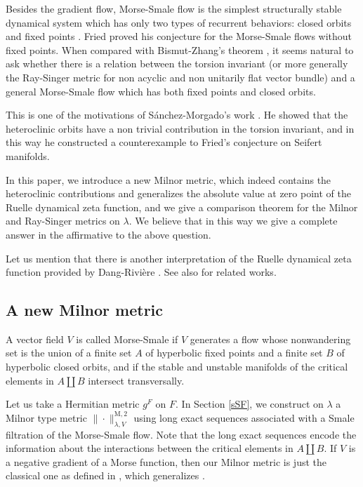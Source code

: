 \documentclass[JEP,XML,SOM,Unicode]{cedram}
\newcommand{\rM}{\mathrm{M}}
\theoremstyle{plain}
\theoremstyle{definition}
\theoremstyle{remark}
\begin{document}
Besides the gradient flow, Morse-Smale flow is the simplest structurally stable dynamical system
which has only two types of recurrent behaviors: closed orbits and
fixed points \cite{Palis68,PalisSmale70}. Fried \cite[Th.\,3.1]{Friedconj}
proved his conjecture for the Morse-Smale flows without fixed points. When compared with Bismut-Zhang's theorem \cite[Th.\,0.2]{BZ92},
it seems natural to ask whether there is a relation between the torsion invariant (or more generally the
Ray-Singer metric for non acyclic and non unitarily flat vector bundle) and a general Morse-Smale flow which has both
fixed points and closed orbits.

This is one of the motivations of Sánchez-Morgado's work
\cite{MorgadoMorseSmale}. He showed that the
heteroclinic orbits have a non trivial contribution in the torsion
invariant, and in this way he constructed a counterexample to Fried's
conjecture on Seifert manifolds.

In this
paper, we introduce a new Milnor metric,
which indeed contains the heteroclinic contributions and
generalizes the absolute value at zero point of the Ruelle dynamical zeta function, and we
give a comparison theorem for the Milnor and Ray-Singer metrics on
$\lambda$. We believe
that in this way we give a complete answer in the affirmative to the above question.

Let us mention that there is another interpretation of the Ruelle dynamical zeta
function provided by Dang-Rivière \cite{DR_MSR}. See also
\cite{DR_MSG, DR_MSI, DR_MSII, DR_MSW} for related works.

\subsection{A new Milnor metric}
A vector field $V$ is called Morse-Smale if $V$ generates a flow
whose nonwandering set is the union of a finite set $A$ of
hyperbolic fixed points and a finite set $B$ of hyperbolic closed orbits, and if the stable and unstable manifolds of the critical
elements in $A\coprod B$ intersect transversally.

Let us take a Hermitian metric $g^{F}$ on $F$. In Section
\ref{sSF}, we construct on $\lambda$ a Milnor type metric
$\|{\cdot}\|^{\rM,2}_{\lambda, V}$ using long exact
sequences associated with a Smale
filtration of the Morse-Smale flow. Note that
the long exact
sequences encode the information about the interactions
between the critical elements in $A\coprod B$. If $V$ is a negative gradient of a Morse function,
then our Milnor metric is just the classical one as defined in
\cite[Def.\,1.9]{BZ92}, which generalizes \cite{MilnorWhiteheadTor}.
\end{document}
